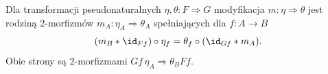 \begin{definicja}[Modyfikacja]\label{cat:def:modification}
Dla transformacji pseudonaturalnych $\eta,\theta:F\Rightarrow G$ modyfikacja $m:\eta\Rightarrow\theta$ jest rodziną 2-morfizmów $m_A:\eta_A\Rightarrow\theta_A$ spełniających dla $f:A\to B$
\begin{equation}\label{cat:eq:modification}
 (m_B\ast\id_{Ff})\circ\eta_f
 =\theta_f\circ(\id_{Gf}\ast m_A).
\end{equation}
Obie strony są 2-morfizmami $Gf\,\eta_A\Rightarrow\theta_B Ff$.
\end{definicja}
\begin{center}
\end{center}

